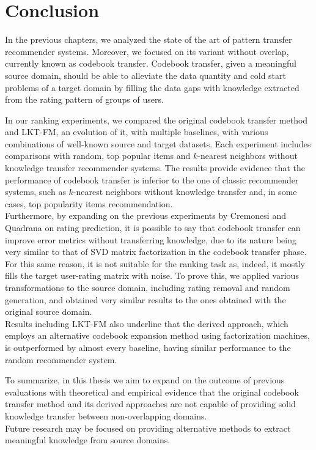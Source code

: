 \chapter{Conclusion}
\label{ch:conclusion}

In the previous chapters, we analyzed the state of the art of pattern transfer recommender systems. Moreover, we focused on its variant without overlap, currently known as codebook transfer. Codebook transfer, given a meaningful source domain, should be able to alleviate the data quantity and cold start problems of a target domain by filling the data gaps with knowledge extracted from the rating pattern of groups of users.\par
In our ranking experiments, we compared the original codebook transfer method and LKT-FM, an evolution of it, with multiple baselines, with various combinations of well-known source and target datasets. Each experiment includes comparisons with random, top popular items and $k$-nearest neighbors without knowledge transfer recommender systems. The results provide evidence that the performance of codebook transfer is inferior to the one of classic recommender systems, such as $k$-nearest neighbors without knowledge transfer and, in some cases, top popularity items recommendation.\\
Furthermore, by expanding on the previous experiments by Cremonesi and Quadrana on rating prediction, it is possible to say that codebook transfer can improve error metrics without transferring knowledge, due to its nature being very similar to that of SVD matrix factorization in the codebook transfer phase.\\
For this same reason, it is not suitable for the ranking task as, indeed, it mostly fills the target user-rating matrix with noise. To prove this, we applied various transformations to the source domain, including rating removal and random generation, and obtained very similar results to the ones obtained with the original source domain.\\
Results including LKT-FM also underline that the derived approach, which employs an alternative codebook expansion method using factorization machines, is outperformed by almost every baseline, having similar performance to the random recommender system.\par
To summarize, in this thesis we aim to expand on the outcome of previous evaluations with theoretical and empirical evidence that the original codebook transfer method and its derived approaches are not capable of providing solid knowledge transfer between non-overlapping domains.\\
Future research may be focused on providing alternative methods to extract meaningful knowledge from source domains.